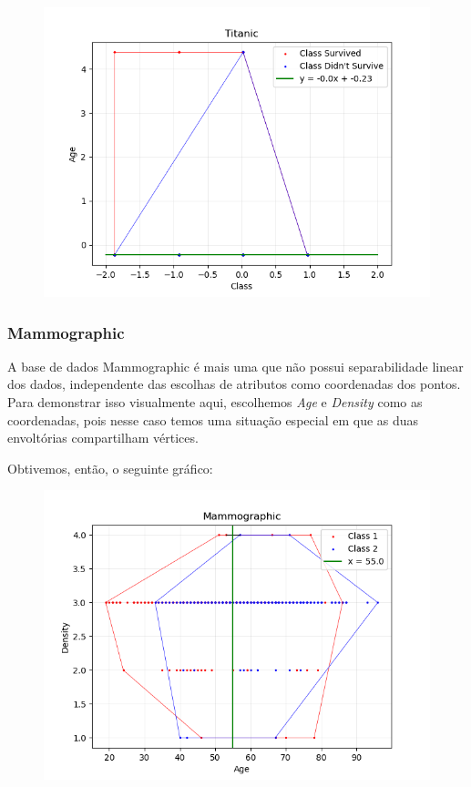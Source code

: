 \documentclass{article}
\begin{document}
\begin{figure} [H]
	\includegraphics[width=12cm]{titanic.png}
	\centering
\end{figure}

\subsubsection{Mammographic}

A base de dados Mammographic é mais uma que não possui separabilidade linear dos dados, independente das escolhas de atributos como coordenadas dos pontos. Para demonstrar isso visualmente aqui, escolhemos \textit{Age} e \textit{Density} como as coordenadas, pois nesse caso temos uma situação especial em que as duas envoltórias compartilham vértices.

Obtivemos, então, o seguinte gráfico:

\begin{figure} [H]
	\includegraphics[width=12cm]{mammographic.png}
	\centering
\end{figure}
\end{document}
